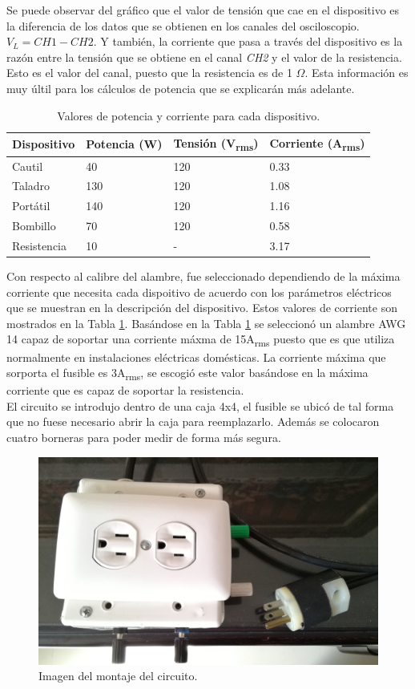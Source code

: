 \documentclass[journal]{IEEEtran}
\begin{document}
Se puede observar del
gráfico que el valor de tensión que cae en el dispositivo
es la diferencia de los datos que se obtienen en los canales 
del osciloscopio. $V_L = CH1 - CH2$. Y también,  
la corriente que 
pasa a través del dispositivo es la razón entre la tensión 
que se obtiene en el canal \textit{CH2} y el valor de la 
resistencia. Esto es el valor del canal, puesto que 
la resistencia es de 1 $\Omega$. Esta información es muy
últil para los cálculos de potencia que se explicarán más 
adelante.

\begin{table}[h]
\centering
\begin{tabular}{|l|p{1.2cm}|p{1.5cm}|p{1.5cm}|}
\hline 
Dispositivo & Potencia (W) & Tensión (V\textsubscript{rms}) 
& Corriente (A\textsubscript{rms}) \\ \hline 
Cautil 	&  40	& 120 	& 0.33 \\ \hline 
Taladro 		& 130	& 120   & 1.08 \\ \hline 
Portátil 		& 140 	& 120   & 1.16 \\ \hline 
Bombillo		& 70  	& 120   & 0.58 \\ \hline 
Resistencia & 10 & - & 3.17 \\ \hline
\end{tabular}
\caption{Valores de potencia y corriente para cada dispositivo.}
\label{current_table}
\end{table}

Con respecto al calibre del alambre, fue seleccionado 
dependiendo de la máxima corriente que necesita cada 
dispoitivo de acuerdo con los parámetros eléctricos 
que se muestran en la descripción del dispositivo. Estos
valores de corriente son mostrados en la Tabla
\ref{current_table}. Basándose en la 
Tabla \ref{current_table} se seleccionó un alambre 
AWG 14 capaz de soportar una corriente máxma de 
15A\textsubscript{rms} puesto que es que utiliza 
normalmente en instalaciones eléctricas domésticas. 
La corriente máxima que sorporta el fusible es 
3A\textsubscript{rms}, se escogió este valor basándose
en la máxima corriente que es capaz de soportar la 
resistencia. \\

El circuito se introdujo dentro de una caja 4x4, el 
fusible se ubicó de tal forma que no fuese necesario 
abrir la caja para reemplazarlo. 
Además se colocaron 
cuatro borneras para poder medir de forma más segura. 

\begin{figure}[h]
\centering
\includegraphics[clip,width=0.7\columnwidth]{circuit_box.png}
\caption{Imagen del montaje del circuito.}
\label{circuit_box}
\end{figure}
\end{document}
